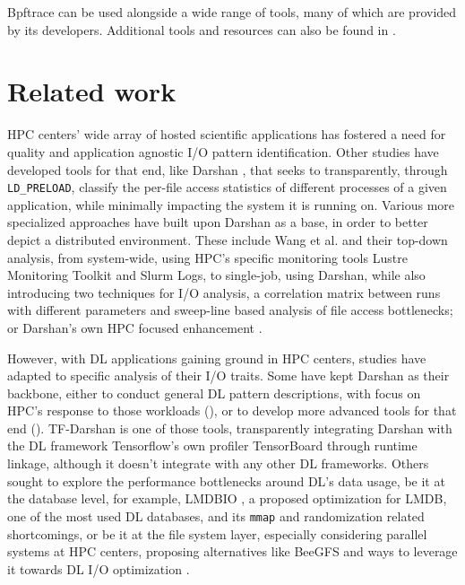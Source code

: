\documentclass[conference]{IEEEtran}
\begin{document}
Bpftrace can be used alongside a wide range of tools, many of which are provided by its developers. Additional tools and resources can also be found in \cite{bgreggBook}.

\section{Related work}


HPC centers' wide array of hosted scientific applications has fostered a need for quality and application agnostic I/O pattern identification. Other studies have developed tools for that end, like Darshan \cite{HPCIO24/7}, that seeks to transparently, through \texttt{LD\_PRELOAD}, classify the per-file access statistics of different processes of a given application, while minimally impacting the system it is running on. Various more specialized approaches have built upon Darshan as a base, in order to better depict a distributed environment. These include Wang et al. \cite{zoomin} and their top-down analysis, from system-wide, using HPC's specific monitoring tools Lustre Monitoring Toolkit and Slurm Logs, to single-job, using Darshan, while also introducing two techniques for I/O analysis, a correlation matrix between runs with different parameters and sweep-line based analysis of file access bottlenecks; or Darshan's own HPC focused enhancement \cite{HPCIODarshan}.

However, with DL applications gaining ground in HPC centers, studies have adapted to specific analysis of their I/O traits. Some have kept Darshan as their backbone, either to conduct general DL pattern descriptions, with focus on HPC's response to those workloads (\cite{IOHPCDLBOOK,CharacterizationMLIOLeadHPC, UnderstandingDLIOHPC}), or to develop more advanced tools for that end (\cite{DFTracerAIHPC}). TF-Darshan \cite{tfdarshan} is one of those tools, transparently integrating Darshan with the DL framework Tensorflow's own profiler TensorBoard through runtime linkage, although it doesn't integrate with any other DL frameworks. Others sought to explore the performance bottlenecks around DL's data usage, be it at the database level, for example, LMDBIO \cite{LMDB}, a proposed optimization for LMDB, one of the most used DL databases, and its \texttt{mmap} and randomization related shortcomings, or be it at the file system layer, especially considering parallel systems at HPC centers, proposing alternatives like BeeGFS \cite{beegfs} and ways to leverage it towards DL I/O optimization \cite{beegfsDL}.
\end{document}
